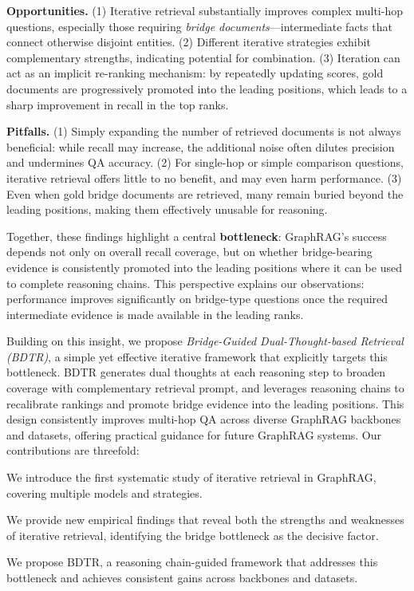 \documentclass{article} %
\begin{document}
\begin{compactenum}[\textbullet]
\item \textbf{Opportunities.} 
(1) Iterative retrieval substantially improves complex multi-hop questions, especially those requiring \emph{bridge documents}—intermediate facts that connect otherwise disjoint entities.  
(2) Different iterative strategies exhibit complementary strengths, indicating potential for combination.  
(3) Iteration can act as an implicit re-ranking mechanism: by repeatedly updating scores, gold documents are progressively promoted into the leading positions, which leads to a sharp improvement in recall in the top ranks.

\item \textbf{Pitfalls.} 
(1) Simply expanding the number of retrieved documents is not always beneficial: while recall may increase, the additional noise often dilutes precision and undermines QA accuracy. 
(2) For single-hop or simple comparison questions, iterative retrieval offers little to no benefit, and may even harm performance.  
(3) Even when gold bridge documents are retrieved, many remain buried beyond the leading positions, making them effectively unusable for reasoning.  
\end{compactenum}

Together, these findings highlight a central \textbf{bottleneck}: GraphRAG’s success depends not only on overall recall coverage, but on whether bridge-bearing evidence is consistently promoted into the leading positions where it can be used to complete reasoning chains. This perspective explains our observations: performance improves significantly on bridge-type questions once the required intermediate evidence is made available in the leading ranks.


Building on this insight, we propose \emph{Bridge-Guided Dual-Thought-based Retrieval (BDTR)}, a simple yet effective iterative framework that explicitly targets this bottleneck. 
BDTR generates dual thoughts at each reasoning step to broaden coverage with complementary retrieval prompt, and leverages reasoning chains to recalibrate rankings and promote bridge evidence into the leading positions.
This design consistently improves multi-hop QA across diverse GraphRAG backbones and datasets, offering practical guidance for future GraphRAG systems. Our contributions are threefold:

\begin{compactenum}[\textbullet]
\item We introduce the first systematic study of iterative retrieval in GraphRAG, covering multiple models and strategies. 
\item We provide new empirical findings that reveal both the strengths and weaknesses of iterative retrieval, identifying the bridge bottleneck as the decisive factor. 
\item We propose BDTR, a reasoning chain-guided framework that addresses this bottleneck and achieves consistent gains across backbones and datasets. 
\end{compactenum}
\end{document}
